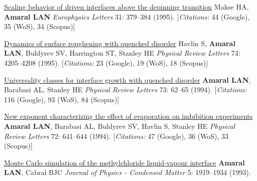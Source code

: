 \NumberedItem{\makebox[0.8cm][r]{[5]}}
\href{/people/amaral/scaling-behavior-of-driven-interfaces-above-the-depinning-transition}
{Scaling behavior of driven interfaces above the depinning transition}
\newline
Makse HA, {\textbf{Amaral LAN}}
\newline
\textit{Europhysics Letters}
    31:
379--384 (1995).
    [{\em{Citations:}} 44 (Google), 35 (WoS), 34 (Scopus)]
\newline
\Gap
~
\Gap

\NumberedItem{\makebox[0.8cm][r]{[4]}}
\href{/people/amaral/dynamics-of-surface-roughening-with-quenched-disorder}
{Dynamics of surface roughening with quenched disorder}
\newline
Havlin S, {\textbf{Amaral LAN}}, Buldyrev SV, Harrington ST, Stanley HE
\newline
\textit{Physical Review Letters}
    74:
4205--4208 (1995).
    [{\em{Citations:}} 23 (Google), 19 (WoS), 18 (Scopus)]
\newline
\Gap
~
\Gap

\NumberedItem{\makebox[0.8cm][r]{[3]}}
\href{/people/amaral/universality-classes-for-interface-growth-with-quenched-disorder}
{Universality classes for interface growth with quenched disorder}
\newline
{\textbf{Amaral LAN}}, Barabasi AL, Stanley HE
\newline
\textit{Physical Review Letters}
    73:
62--65 (1994).
    [{\em{Citations:}} 116 (Google), 93 (WoS), 84 (Scopus)]
\newline
\Gap
~
\Gap

\NumberedItem{\makebox[0.8cm][r]{[2]}}
\href{/people/amaral/new-exponent-characterizing-the-effect-of-evaporation-on-imbibition-experiments}
{New exponent characterizing the effect of evaporation on imbibition experiments}
\newline
{\textbf{Amaral LAN}}, Barabasi AL, Buldyrev SV, Havlin S, Stanley HE
\newline
\textit{Physical Review Letters}
    72:
641--644 (1994).
    [{\em{Citations:}} 47 (Google), 36 (WoS), 33 (Scopus)]
\newline
\Gap
~
\Gap

\NumberedItem{\makebox[0.8cm][r]{[1]}}
\href{/people/amaral/monte-carlo-simulation-of-the-methylchloride-liquid-vapor-interface}
{Monte Carlo simulation of the methylchloride liquid-vapour interface}
\newline
{\textbf{Amaral LAN}}, Cabral BJC
\newline
\textit{Journal of Physics - Condensed Matter}
    5:
1919--1934 (1993).
\newline
\Gap
~
\Gap

